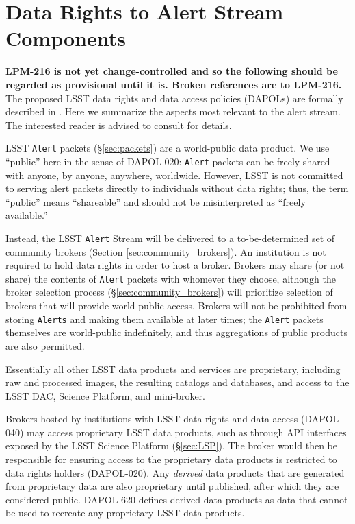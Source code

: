 \section{Data Rights to Alert Stream Components}\label{sec:data_rights}

\textbf{LPM-216 is not yet change-controlled and so the following should be regarded as provisional until it is. Broken references are to LPM-216.} The proposed LSST data rights and data access policies (DAPOLs) are formally described in . Here we summarize the aspects most relevant to the alert stream. The interested reader is advised to consult  for details.

LSST {\tt Alert} packets (\S \ref{sec:packets}) are a world-public data product.
We use ``public'' here in the sense of DAPOL-020:  \texttt{Alert} packets can be freely shared with anyone, by anyone, anywhere, worldwide.
However, LSST is not committed to serving alert packets directly to individuals without data rights;
thus, the term ``public'' means ``shareable'' and should not be misinterpreted as ``freely available.''

Instead, the LSST {\tt Alert} Stream will be delivered to a to-be-determined set of community brokers (Section \ref{sec:community_brokers}).
An institution is not required to hold data rights in order to host a broker.
Brokers may share (or not share) the contents of {\tt Alert} packets with whomever they choose, 
although the broker selection process (\S \ref{sec:community_brokers}) will prioritize selection of brokers that will provide world-public access.
Brokers will not be prohibited from storing {\tt Alerts} and making them available at later times;
the {\tt Alert} packets themselves are world-public indefinitely, and thus aggregations of public products are also permitted.

Essentially all other LSST data products and services are proprietary, including raw and processed images, the resulting catalogs and databases, and access to the LSST DAC, Science Platform, and mini-broker.

Brokers hosted by institutions with LSST data rights and data access (DAPOL-040) may access proprietary LSST data products, such as through API interfaces exposed by the LSST Science Platform (\S \ref{sec:LSP}).
The broker would then be responsible for ensuring access to the proprietary data products is restricted to data rights holders (DAPOL-020).
Any \textit{derived} data products that are generated from proprietary data are also proprietary until published, after which they are considered public. 
DAPOL-620 defines derived data products as data that cannot be used to recreate any proprietary LSST data products.

